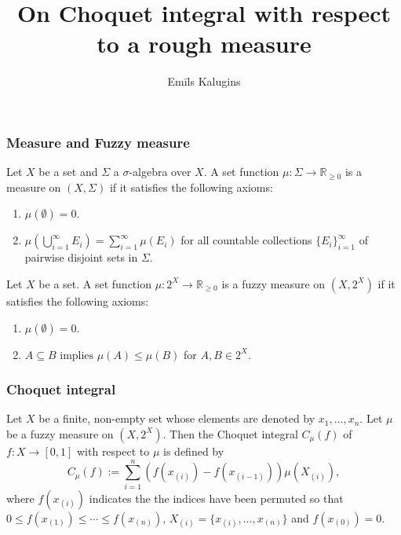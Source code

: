 \documentclass[envcountsect]{beamer}
\title{On Choquet integral with respect to a rough measure}
\author{Emīls Kalugins}
\begin{document}
\begin{frame}
	\maketitle
\end{frame}
\begin{frame}
\frametitle{Measure and Fuzzy measure}

	\begin{definition}
		Let $X$ be a set and $\Sigma$ a $\sigma$-algebra over $X$. A set function $\mu : \Sigma \rightarrow \mathbb{R}_{\geq 0}$ is a measure on $(X,\Sigma)$ if it satisfies the following axioms:
		\begin{enumerate}
			\item $\mu(\emptyset) = 0.$ \\
			\item $\mu\left(\bigcup\limits_{i=1}^\infty E_i \right) = \sum\limits_{i=1}^\infty \mu(E_i)$ for all countable collections $\{E_i\}_{i=1}^\infty$ of pairwise disjoint sets in $\Sigma.$		
		\end{enumerate}


	\end{definition}

\begin{definition}

	Let $X$ be a set. A set function $\mu:2^{X} \rightarrow \mathbb{R}_{\geq 0}$ is a fuzzy measure on $(X, 2^X)$ if it satisfies the following axioms:

\begin{enumerate}
\item $\mu(\emptyset) =0.$ \\
\item $A \subseteq B \text{ implies } \mu(A) \leq \mu(B)$ for $A,B \in 2^X$.
\end{enumerate}

\end{definition}

\end{frame}

\begin{frame}
\frametitle{Choquet integral}

\begin{definition}
Let $X$ be a finite, non-empty set whose elements are denoted by $x_1,\dots,x_n$. 
Let $\mu$ be a fuzzy measure on $(X,2^X)$. Then the Choquet integral $C_{\mu}(f)$ of $f: X \rightarrow [0,1]$ with respect to $\mu$ is defined by
$$
C_{\mu}(f) := \sum_{i=1}^n (f(x_{(i)}) - f(x_{(i-1)}))\mu(X_{(i)}),
$$
where $ f(x_{(i)})$ indicates the the indices have been permuted so that
$ 0 \leq f(x_{(1)}) \leq \cdots \leq f(x_{(n)})$, $X_{(i)} = \{x_{(i)}, \dots ,x_{(n)}\}$ and $f(x_{(0)})=0.$
\end{definition}

\end{frame}
\end{document}
